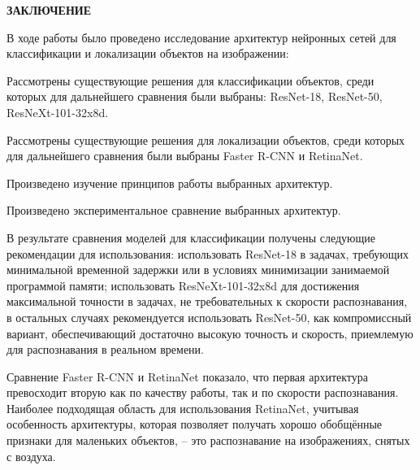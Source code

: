 \newpage
\begin{center}
	\textbf{ЗАКЛЮЧЕНИЕ}
\end{center}
В ходе работы было проведено исследование архитектур нейронных сетей для классификации и локализации объектов на изображении: 
\begin{enumerate*}
	\item Рассмотрены существующие решения для классификации объектов, среди которых для дальнейшего сравнения были выбраны: ResNet-18, ResNet-50, ResNeXt-101-32x8d.
	\item Рассмотрены существующие решения для локализации объектов, среди которых для дальнейшего сравнения были выбраны Faster R-CNN и RetinaNet.
	\item Произведено изучение принципов работы выбранных архитектур.
	\item Произведено экспериментальное сравнение выбранных архитектур.
\end{enumerate*}

В результате сравнения моделей для классификации получены следующие рекомендации для использования: использовать ResNet-18 в задачах, требующих минимальной временной задержки или в условиях минимизации занимаемой программой памяти; использовать ResNeXt-101-32x8d для достижения максимальной точности в задачах, не требовательных к скорости распознавания,  в остальных случаях рекомендуется использовать ResNet-50, как компромиссный вариант, обеспечивающий достаточно высокую точность и скорость, приемлемую для распознавания в реальном времени.

Сравнение Faster R-CNN и RetinaNet показало, что первая архитектура превосходит вторую как по качеству работы, так и по скорости распознавания. Наиболее подходящая область для использования RetinaNet, учитывая особенность архитектуры, которая позволяет получать хорошо обобщённые признаки для маленьких объектов, -- это распознавание на изображениях, снятых с воздуха.  
